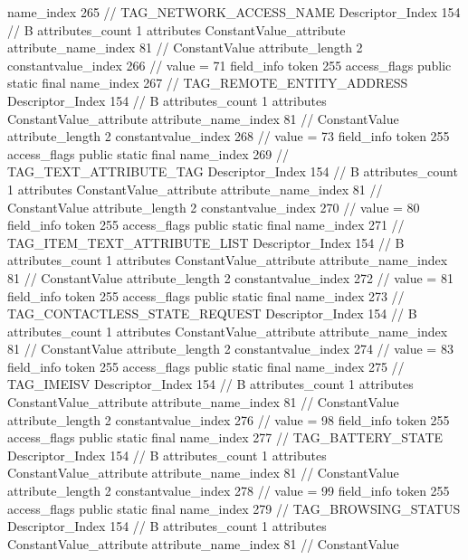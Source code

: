 {{{{{				name_index	265		// TAG_NETWORK_ACCESS_NAME
				Descriptor_Index	154		// B
				attributes_count	1
				attributes {
				ConstantValue_attribute {
					attribute_name_index	81		// ConstantValue
					attribute_length	2
					constantvalue_index	266		// value = 71
				}
				}
			}
			field_info {
				token	255
				access_flags	public static final
				name_index	267		// TAG_REMOTE_ENTITY_ADDRESS
				Descriptor_Index	154		// B
				attributes_count	1
				attributes {
				ConstantValue_attribute {
					attribute_name_index	81		// ConstantValue
					attribute_length	2
					constantvalue_index	268		// value = 73
				}
				}
			}
			field_info {
				token	255
				access_flags	public static final
				name_index	269		// TAG_TEXT_ATTRIBUTE_TAG
				Descriptor_Index	154		// B
				attributes_count	1
				attributes {
				ConstantValue_attribute {
					attribute_name_index	81		// ConstantValue
					attribute_length	2
					constantvalue_index	270		// value = 80
				}
				}
			}
			field_info {
				token	255
				access_flags	public static final
				name_index	271		// TAG_ITEM_TEXT_ATTRIBUTE_LIST
				Descriptor_Index	154		// B
				attributes_count	1
				attributes {
				ConstantValue_attribute {
					attribute_name_index	81		// ConstantValue
					attribute_length	2
					constantvalue_index	272		// value = 81
				}
				}
			}
			field_info {
				token	255
				access_flags	public static final
				name_index	273		// TAG_CONTACTLESS_STATE_REQUEST
				Descriptor_Index	154		// B
				attributes_count	1
				attributes {
				ConstantValue_attribute {
					attribute_name_index	81		// ConstantValue
					attribute_length	2
					constantvalue_index	274		// value = 83
				}
				}
			}
			field_info {
				token	255
				access_flags	public static final
				name_index	275		// TAG_IMEISV
				Descriptor_Index	154		// B
				attributes_count	1
				attributes {
				ConstantValue_attribute {
					attribute_name_index	81		// ConstantValue
					attribute_length	2
					constantvalue_index	276		// value = 98
				}
				}
			}
			field_info {
				token	255
				access_flags	public static final
				name_index	277		// TAG_BATTERY_STATE
				Descriptor_Index	154		// B
				attributes_count	1
				attributes {
				ConstantValue_attribute {
					attribute_name_index	81		// ConstantValue
					attribute_length	2
					constantvalue_index	278		// value = 99
				}
				}
			}
			field_info {
				token	255
				access_flags	public static final
				name_index	279		// TAG_BROWSING_STATUS
				Descriptor_Index	154		// B
				attributes_count	1
				attributes {
				ConstantValue_attribute {
					attribute_name_index	81		// ConstantValue
}}}}}}}
